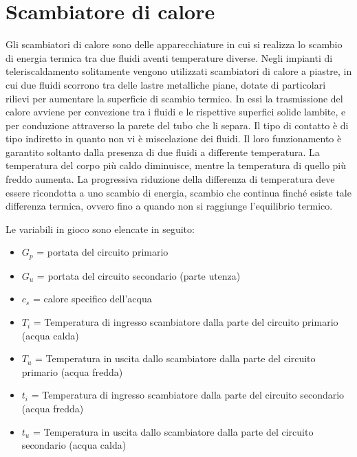 \documentclass[laurea,oneside,11pt]{USiena_tesiLM}
\begin{document}
\section{Scambiatore di calore}
\label{subsec:scambiatore_di_calore}
Gli scambiatori di calore sono  delle apparecchiature in cui si realizza lo scambio di energia termica tra due fluidi aventi temperature diverse. Negli impianti di teleriscaldamento solitamente vengono utilizzati scambiatori di calore a piastre, in cui due fluidi scorrono tra delle lastre metalliche piane, dotate di particolari rilievi per aumentare la superficie di scambio termico. In essi la trasmissione del calore avviene per convezione tra i fluidi e le rispettive superfici solide lambite,  e per conduzione attraverso la parete del tubo che li separa. Il tipo di contatto è di tipo indiretto in quanto non vi è miscelazione dei fluidi.
Il loro funzionamento è garantito soltanto dalla presenza di due fluidi a differente temperatura. La temperatura del corpo più caldo diminuisce, mentre la temperatura di quello più freddo aumenta. La progressiva riduzione della differenza di temperatura deve essere ricondotta a uno scambio di energia, scambio che continua finché esiste tale differenza termica, ovvero fino a quando non si raggiunge l'equilibrio termico. 

Le variabili in gioco sono elencate in seguito:
\begin{itemize}
\item[] $G_p$ = portata del circuito primario
\item[]$G_u$ = portata del circuito secondario (parte utenza)
\item[]$c_s$ = calore specifico dell'acqua
\item[]$T_i$ = Temperatura di ingresso scambiatore dalla parte del circuito primario (acqua calda)
\item[]$T_u$ = Temperatura in uscita dallo scambiatore dalla parte del circuito primario (acqua fredda)
\item[]$t_i$ = Temperatura di ingresso scambiatore dalla parte del circuito secondario (acqua fredda)
\item[]$t_u$ = Temperatura in uscita dallo scambiatore dalla parte del circuito secondario (acqua calda)
\end{itemize}
\end{document}
